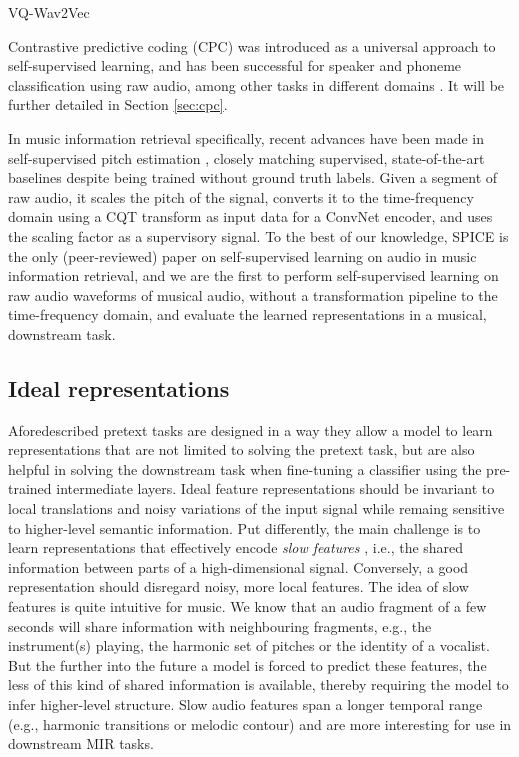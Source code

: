 VQ-Wav2Vec

Contrastive predictive coding (CPC) was introduced as a universal approach to self-supervised learning, and has been successful for speaker and phoneme classification using raw audio, among other tasks in different domains \cite{oord_representation_2019}. It will be further detailed in Section \ref{sec:cpc}.

In music information retrieval specifically, recent advances have been made in self-supervised pitch estimation \cite{spice}, closely matching supervised, state-of-the-art baselines despite being trained without ground truth labels. Given a segment of raw audio, it scales the pitch of the signal, converts it to the time-frequency domain using a CQT transform as input data for a ConvNet encoder, and uses the scaling factor as a supervisory signal. To the best of our knowledge, SPICE\cite{spice} is the only (peer-reviewed) paper on self-supervised learning on audio in music information retrieval, and we are the first to perform self-supervised learning on raw audio waveforms of musical audio, without a transformation pipeline to the time-frequency domain, and evaluate the learned representations in a musical, downstream task.

\subsection{Ideal representations}
Aforedescribed pretext tasks are designed in a way they allow a model to learn representations that are not limited to solving the pretext task, but are also helpful in solving the downstream task when fine-tuning a classifier using the pre-trained intermediate layers. Ideal feature representations should be invariant to local translations and noisy variations of the input signal while remaing sensitive to higher-level semantic information. Put differently, the main challenge is to learn representations that effectively encode \textit{slow features} \cite{wiskott_slow_2002}, i.e., the shared information between parts of a high-dimensional signal. Conversely, a good representation should disregard noisy, more local features. The idea of slow features is quite intuitive for music.
We know that an audio fragment of a few seconds will share information with neighbouring fragments, e.g., the instrument(s) playing, the harmonic set of pitches or the identity of a vocalist.  But the further into the future a model is forced to predict these features, the less of this kind of shared information is available, thereby requiring the model to infer higher-level structure. Slow audio features span a longer temporal range (e.g., harmonic transitions or melodic contour) and are more interesting for use in downstream MIR tasks.



